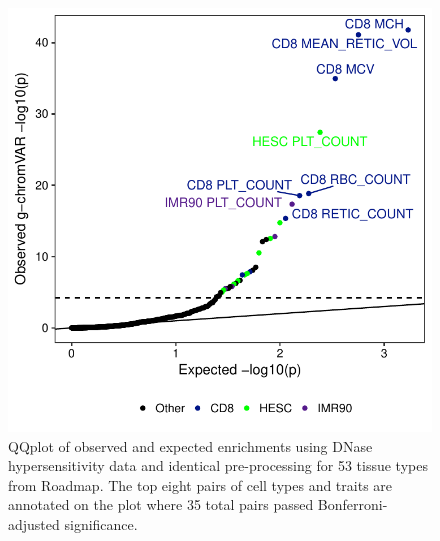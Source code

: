 \documentclass{article}\usepackage[]{graphicx}\usepackage[]{color}
\makeatletter
\def\maxwidth{ %
  \ifdim\Gin@nat@width>\linewidth
    \linewidth
  \else
    \Gin@nat@width
  \fi
}
\newenvironment{knitrout}{}{} %
\makeatother
\begin{document}
\begin{knitrout}
\color{fgcolor}\begin{figure}[H]

{\centering \includegraphics[width=\maxwidth]{figure/roadmapPlot-1} 

}

\caption[QQplot of observed and expected enrichments using DNase hypersensitivity data and identical pre-processing for 53 tissue types from Roadmap]{QQplot of observed and expected enrichments using DNase hypersensitivity data and identical pre-processing for 53 tissue types from Roadmap. The top eight pairs of cell types and traits are annotated on the plot where 35 total pairs passed Bonferroni-adjusted significance. }\label{fig:roadmapPlot}
\end{figure}


\end{knitrout}
\end{document}
